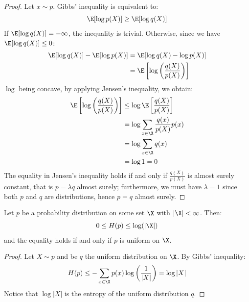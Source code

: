 \documentclass[toc, titlepaged]{../cs-classes/cs-classes}
\begin{document}
\begin{proof}
    Let $x\sim p$. Gibbs' inequality is equivalent to:
    \begin{equation*}
        \E[\log p(X)] \geq \E[\log q(X)]
    \end{equation*}
    If $\E[\log q(X)] = -\infty$, the inequality is trivial. Otherwise, since we have $\E[\log q(X)] \leq 0$:
    \begin{equation*}
        \begin{aligned}
            \E[\log q(X)] - \E[\log p(X)] &= \E[\log q(X) - \log p(X)] \\
            &= \E\left[\log\left(\frac{q(X)}{p(X)}\right)\right]
        \end{aligned}
    \end{equation*}
    $\log$ being concave, by applying Jensen's inequality, we obtain:
    \begin{equation*}
        \begin{aligned}
            \E\left[\log\left(\frac{q(X)}{p(X)}\right)\right] &\leq \log\E\left[\frac{q(X)}{p(X)}\right] \\
            &= \log\sum_{x\in\X} \frac{q(x)}{p(X)}p(x)\\
            &= \log\sum_{x\in\X} q(x)\\
            &= \log 1 = 0
        \end{aligned}
    \end{equation*}
    The equality in Jensen's inequality holds if and only if $\frac{q(X)}{p(X)}$ is almost surely constant, that is $p=\lambda q$ almost surely; furthermore, we must have $\lambda=1$ since both $p$ and $q$ are distributions, hence $p=q$ almost surely. 
\end{proof}

\begin{corollary}
    Let $p$ be a probability distribution on some set $\X$ with $|\X|<\infty$. Then:
    \begin{equation*}
        0\leq H(p) \leq \log(|\X|)
    \end{equation*}
    and the equality holds if and only if $p$ is uniform on $\X$.
\end{corollary}

\begin{proof}
    Let $X \sim p$ and be $q$ the uniform distribution on $\X$. By Gibbs' inequality:
    \begin{equation*}
        H(p) \leq -\sum_{x\in\X}p(x)\log\left(\frac{1}{|X|}\right) = \log|X|
    \end{equation*}
    Notice that $\log|X|$ is the entropy of the uniform distribution $q$.
\end{proof}
\end{document}
